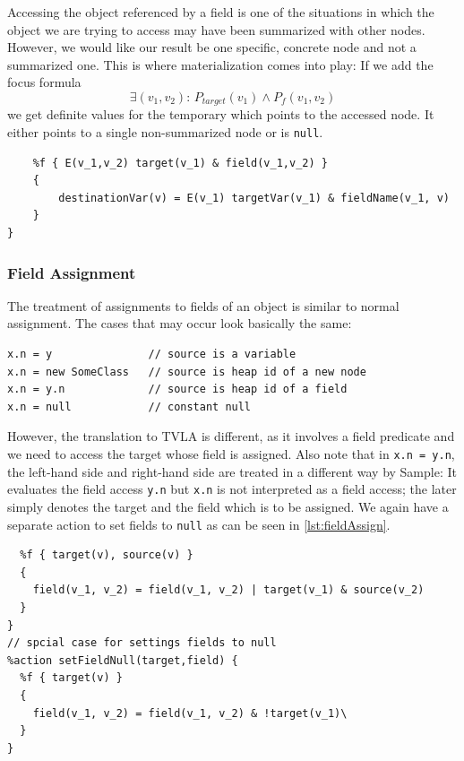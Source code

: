\documentclass[11pt,a4paper,english]{article}
\begin{document}
Accessing the object referenced by a field is one of the situations in which the
object we are trying to access may have been summarized with other nodes.
However, we would like our result be one specific, concrete node and not a
summarized one. This is where materialization comes into play: If we add the
focus formula
\[
\exists(v_1, v_2): \, P_{target}(v_1) \land P_f(v_1,v_2)
\]
we get definite values for the temporary which points to the accessed node. It
either points to a single non-summarized node or is \texttt{null}.

\begin{lstlisting}[language=tvp,caption={Action for Field
  Access},label=lst:fieldAccess]
%action extractField(destinationVar,targetVar,fieldName) {
	%f { E(v_1,v_2) target(v_1) & field(v_1,v_2) }
	{
		destinationVar(v) = E(v_1) targetVar(v_1) & fieldName(v_1, v)
	}
}
\end{lstlisting}



\subsubsection{Field Assignment} 
The treatment of assignments to fields of an object is similar to normal
assignment. The cases that may occur look basically the same:
\begin{lstlisting}[caption={Field Assignments},label=lst:varAssignFieldExample]
x.n = y               // source is a variable
x.n = new SomeClass   // source is heap id of a new node
x.n = y.n             // source is heap id of a field
x.n = null            // constant null
\end{lstlisting}

However, the translation to TVLA is different, as it involves a field predicate
and we need to access the target whose field is assigned. Also note that in
\lstinline!x.n = y.n!, the left-hand side and right-hand side are treated in a
different way by Sample: It evaluates the field access \lstinline!y.n! but
\lstinline!x.n! is not interpreted as a field access; the later simply denotes
the target and the field which is to be assigned. We again have a separate
action to set fields to \texttt{null} as can be seen in \autoref{lst:fieldAssign}.

\begin{lstlisting}[language=tvp,caption={Action for Field Assignment},label=lst:fieldAssign]
%action setField(target,field,source) {
  %f { target(v), source(v) }
  {
    field(v_1, v_2) = field(v_1, v_2) | target(v_1) & source(v_2)
  }
}
// spcial case for settings fields to null
%action setFieldNull(target,field) {
  %f { target(v) }
  {
    field(v_1, v_2) = field(v_1, v_2) & !target(v_1)\
  }
}
\end{lstlisting}
\end{document}
